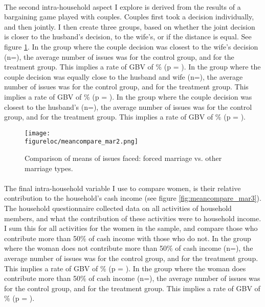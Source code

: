 \documentclass[11pt,a4paper]{scrartcl} %
\newcommand{\figureloc}{C:/Users/Koen/Dropbox/PhD/Papers/CongoGBV/Figures}
\begin{document}
\paragraph{}
The second intra-household aspect I explore is derived from the results of a bargaining game played with couples. Couples first took a decision individually, and then jointly. I then create three groups, based on whether the joint decision is closer to the husband's decision, to the wife's, or if the distance is equal. See figure \ref{fig:meancompare_mar2}. In the group where the couple decision was closest to the wife's decision (n=), the average number of issues was  for the control group, and  for the treatment group. This implies a rate of GBV of \% (p = ). In the group where the couple decision was equally close to the husband and wife (n=), the average number of issues was  for the control group, and  for the treatment group. This implies a rate of GBV of \% (p = ). In the group where the couple decision was closest to the husband's (n=), the average number of issues was  for the control group, and  for the treatment group. This implies a rate of GBV of \% (p = ).

\begin{figure}
  \texttt{[image: \\figureloc/meancompare\_mar2.png]}
  \caption{Comparison of means of issues faced: forced marriage vs. other marriage types.}
  \label{fig:meancompare_mar2}
\end{figure}


\paragraph{}
The final intra-household variable I use to compare women, is their relative contribution to the household's cash income (see figure \ref{fig:meancompare_mar3}). The household questionnaire collected data on all activities of household members, and what the contribution of these activities were to household income. I sum this for all activities for the women in the sample, and compare those who contribute more than 50\% of cash income with those who do not. In the group where the woman does not contribute more than 50\% of cash income (n=), the average number of issues was  for the control group, and  for the treatment group. This implies a rate of GBV of \% (p = ). In the group where the woman does contribute more than 50\% of cash income (n=), the average number of issues was  for the control group, and  for the treatment group. This implies a rate of GBV of \% (p = ). 
\end{document}
